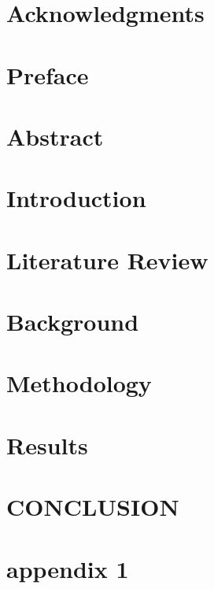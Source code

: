 \documentclass[12pt, twoside, openright]{report}
\begin{document}
	
	
	
	\chapter*{}
	
	
	\chapter*{Acknowledgments}
	
	\newpage
	
	\chapter*{Preface}
	
	
	\chapter*{Abstract}
	
	
	\tableofcontents
	\listoffigures
	\listoftables
	
	\chapter{Introduction}
	
	
	\chapter{Literature Review}
	
	
	\chapter{Background}
	
	
	\chapter{Methodology}
	
	
	\chapter{Results}
	
	
	\chapter{CONCLUSION}
	
	
	\appendix
	\chapter{appendix 1}
	
	
	
	
\end{document}
